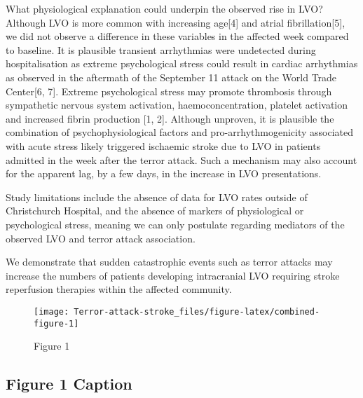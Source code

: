 \documentclass[
]{article}
\begin{document}
What physiological explanation could underpin the observed rise in LVO?
Although LVO is more common with increasing age{[}4{]} and atrial
fibrillation{[}5{]}, we did not observe a difference in these variables
in the affected week compared to baseline. It is plausible transient
arrhythmias were undetected during hospitalisation as extreme
psychological stress could result in cardiac arrhythmias as observed in
the aftermath of the September 11 attack on the World Trade Center{[}6,
7{]}. Extreme psychological stress may promote thrombosis through
sympathetic nervous system activation, haemoconcentration, platelet
activation and increased fibrin production {[}1, 2{]}. Although
unproven, it is plausible the combination of psychophysiological factors
and pro-arrhythmogenicity associated with acute stress likely triggered
ischaemic stroke due to LVO in patients admitted in the week after the
terror attack. Such a mechanism may also account for the apparent lag,
by a few days, in the increase in LVO presentations.

Study limitations include the absence of data for LVO rates outside of
Christchurch Hospital, and the absence of markers of physiological or
psychological stress, meaning we can only postulate regarding mediators
of the observed LVO and terror attack association.

We demonstrate that sudden catastrophic events such as terror attacks
may increase the numbers of patients developing intracranial LVO
requiring stroke reperfusion therapies within the affected community.

\begin{figure}
\texttt{[image: Terror-attack-stroke\_files/figure-latex/combined-figure-1]} \caption{Figure 1}\label{fig:combined-figure}
\end{figure}

\hypertarget{figure-1-caption}{%
\subsection{Figure 1 Caption}\label{figure-1-caption}}
\end{document}
